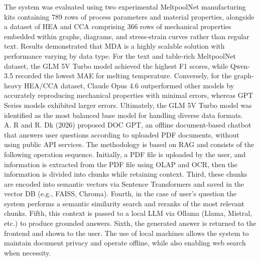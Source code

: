 \documentclass[11pt,a4paper]{report}
\begin{document}
The system was evaluated using two experimental MeltpoolNet manufacturing kits containing 789 rows of process parameters and material properties, alongside a dataset of \ac{HEA} and \ac{CCA} comprising 366 rows of mechanical properties embedded within graphs, diagrams, and stress-strain curves rather than regular text. Results demonstrated that \ac{MDA} is a highly scalable solution with performance varying by data type. For the text and table-rich MeltpoolNet dataset, the GLM 5V Turbo model achieved the highest F1 scores, while Qwen-3.5 recorded the lowest \ac{MAE} for melting temperature. Conversely, for the graph-heavy \ac{HEA}/\ac{CCA} dataset, Claude Opus 4.6 outperformed other models by accurately reproducing mechanical properties with minimal errors, whereas GPT Series models exhibited larger errors. Ultimately, the GLM 5V Turbo model was identified as the most balanced base model for handling diverse data formats.\\

A. R and R. Dk \cite{R2026DOCGA} (2026) proposed DOC GPT, an offline document-based chatbot that answers user questions according to uploaded PDF documents, without using public \ac{API} services. The methodology is based on \ac{RAG} and consists of the following operation sequence. Initially, a PDF file is uploaded by the user, and information is extracted from the PDF file using \ac{OLAP} and \ac{OCR}, then the information is divided into chunks while retaining context. Third, these chunks are encoded into semantic vectors via Sentence Transformers and saved in the vector DB (e.g., \ac{FAISS}, Chroma). Fourth, in the case of user's question the system performs a semantic similarity search and reranks of the most relevant chunks. Fifth, this context is passed to a local \ac{LLM} via Ollama (Llama, Mistral, etc.) to produce grounded answers. Sixth, the generated answer is returned to the frontend and shown to the user. The use of local machines allows the system to maintain document privacy and operate offline, while also enabling web search when necessity.\\
\end{document}
